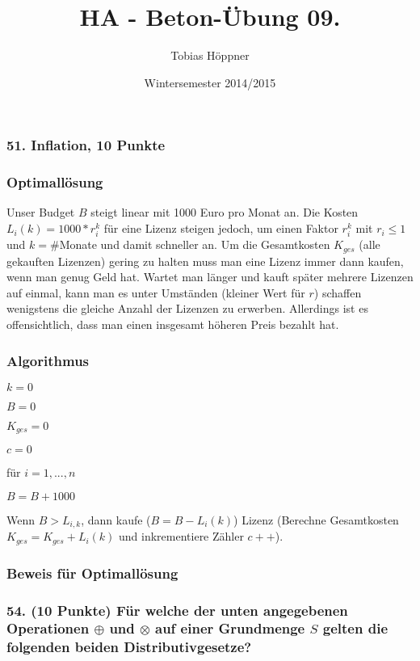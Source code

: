 \documentclass[ngerman,a4paper]{report}
\author{Tobias Höppner}
\title{HA - Beton-Übung 09.}
\date{Wintersemester 2014/2015}
\renewcommand{\maketitle}{}
\begin{document}
 
\maketitle 

\subsubsection*{51. Inflation, 10 Punkte}
\subsubsection*{Optimallösung}
Unser Budget $B$ steigt linear mit 1000 Euro pro Monat an. Die Kosten $L_{i}(k) = 1000*r_i^k$ für eine Lizenz steigen jedoch, um einen Faktor $r_i^k$ mit $r_i\leq 1$ und $k=\#$Monate und damit schneller an. Um die Gesamtkosten $K_{ges}$ (alle gekauften Lizenzen) gering zu halten muss man eine Lizenz immer dann kaufen, wenn man genug Geld hat. Wartet man länger und kauft später mehrere Lizenzen auf einmal, kann man es unter Umständen (kleiner Wert für $r$) schaffen wenigstens die gleiche Anzahl der Lizenzen zu erwerben. Allerdings ist es offensichtlich, dass man einen insgesamt höheren Preis bezahlt hat.
\subsubsection*{Algorithmus}
\begin{compactitem}
\item $k=0$
\item $B=0$
\item $K_{ges}=0$
\item $c=0$
\item für $i = 1,...,n$
\begin{compactitem}
\item $B=B+1000$
\item Wenn $B > L_{i,k}$, dann kaufe ($B = B - L_i(k)$) Lizenz (Berechne Gesamtkosten $K_{ges}=K_{ges}+L_i(k)$ und inkrementiere Zähler $c++$).
\end{compactitem}
\end{compactitem}
\subsubsection*{Beweis für Optimallösung}


\subsubsection*{54. (10 Punkte) Für welche der unten angegebenen Operationen $\oplus$ und $\otimes$ auf einer Grundmenge $S$ gelten die folgenden beiden Distributivgesetze?} 
\end{document}
